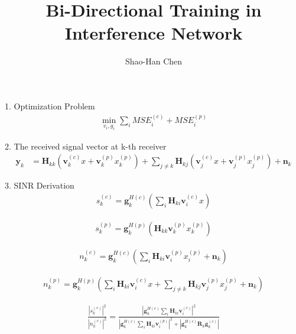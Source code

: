 \documentclass[11pt, oneside]{article}   	%
\title{Bi-Directional Training in Interference Network}
\author{Shao-Han Chen}
\begin{document}
\maketitle

1. Optimization Problem
\begin{align*}
\min_{v_{i} , g_{i}} \displaystyle\sum_{i} MSE^{(c)}_{i}+MSE^{(p)}_{i}
\end{align*}

2. The received signal vector at k-th receiver
\begin{align*}
\textbf{y}_{k} &= \textbf{H}_{kk}
			(\textbf{v}^{(c)}_{k}x
			+\textbf{v}^{(p)}_{k}x^{(p)}_{k})
			+\displaystyle\sum_{j \neq k}\textbf{H}_{kj}(\textbf{v}^{(c)}_{j}x+\textbf{v}^{(p)}_{j}x^{(p)}_{j})
			+\textbf{n}_{k}
\end{align*}

3. SINR Derivation
\begin{align*}
s^{(c)}_{k} = \textbf{g}^{H(c)}_{k}
		(\displaystyle\sum_{i}
		\textbf{H}_{ki} 
		\textbf{v}^{(c)}_{i}x)
\end{align*}

\begin{align*}
s^{(p)}_{k} = \textbf{g}^{H(p)}_{k}
		(\textbf{H}_{kk} 
		\textbf{v}^{(p)}_{k}x^{(p)}_{k})
\end{align*}

\begin{align*}
n^{(c)}_{k} = \textbf{g}^{H(c)}_{k}
		(\displaystyle\sum_{i}
		\textbf{H}_{ki} 
		\textbf{v}^{(p)}_{i}x^{(p)}_{i}
		+\textbf{n}_{k})
\end{align*}

\begin{align*}
n^{(p)}_{k} = \textbf{g}^{H(p)}_{k}
		(\displaystyle\sum_{i}
		\textbf{H}_{ki} 
		\textbf{v}^{(c)}_{i}x
		+\displaystyle\sum_{j \neq k}\textbf{H}_{kj}\textbf{v}^{(p)}_{j}x^{(p)}_{j}
		+\textbf{n}_{k})
\end{align*}

\begin{align*}
\frac	{	|s^{(c)}_{k}|^2	}{	|n^{(c)}_{k}|^2	} = 
\frac {|\textbf{g}^{H(c)}_{k}
		\displaystyle\sum_{i}
		\textbf{H}_{ki} 
		\textbf{v}^{(c)}_{i}|^2	
	} 
	{	|\textbf{g}^{H(c)}_{k}
		\displaystyle\sum_{i}
		\textbf{H}_{ki} 
		\textbf{v}^{(p)}_{i}|^2
		+|\textbf{g}^{H(c)}_{k}
		\textbf{R}_{k}
		\textbf{g}^{(c)}_{k}|
	}
\end{align*}
\end{document}
